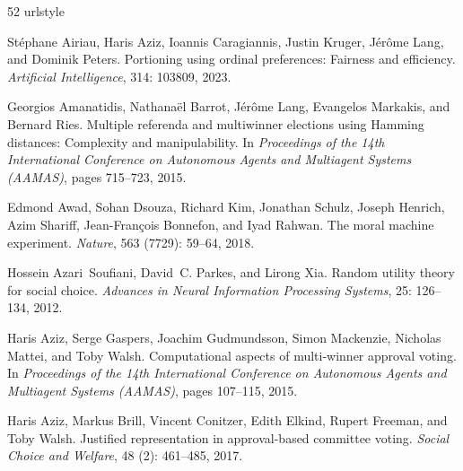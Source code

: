 \documentclass[10pt]{scrartcl}
\theoremstyle{plain}
\theoremstyle{definition}
\begin{document}

\begin{thebibliography}{52}
	\providecommand{\natexlab}[1]{#1}
	\providecommand{\url}[1]{\texttt{#1}}
	\expandafter\ifx\csname urlstyle\endcsname\relax
	\providecommand{\doi}[1]{doi: #1}\else
	\providecommand{\doi}{doi: \begingroup \urlstyle{rm}\Url}\fi
	
	St{\'e}phane Airiau, Haris Aziz, Ioannis Caragiannis, Justin Kruger,
	J{\'e}r{\^o}me Lang, and Dominik Peters.
	\newblock Portioning using ordinal preferences: Fairness and efficiency.
	\newblock \emph{Artificial Intelligence}, 314: 103809, 2023.
	
	Georgios Amanatidis, Nathana{\"e}l Barrot, J{\'e}r{\^o}me Lang, Evangelos
	Markakis, and Bernard Ries.
	\newblock Multiple referenda and multiwinner elections using {Hamming}
	distances: Complexity and manipulability.
	\newblock In \emph{Proceedings of the 14th International Conference on
		Autonomous Agents and Multiagent Systems (AAMAS)}, pages 715--723, 2015.
	
	Edmond Awad, Sohan Dsouza, Richard Kim, Jonathan Schulz, Joseph Henrich, Azim
	Shariff, Jean-Fran{\c{c}}ois Bonnefon, and Iyad Rahwan.
	\newblock The moral machine experiment.
	\newblock \emph{Nature}, 563 (7729): 59--64, 2018.
	
	Hossein Azari~Soufiani, David~C. Parkes, and Lirong Xia.
	\newblock Random utility theory for social choice.
	\newblock \emph{Advances in Neural Information Processing Systems},
	25: 126--134, 2012.
	
	Haris Aziz, Serge Gaspers, Joachim Gudmundsson, Simon Mackenzie, Nicholas
	Mattei, and Toby Walsh.
	\newblock Computational aspects of multi-winner approval voting.
	\newblock In \emph{Proceedings of the 14th International Conference on
		Autonomous Agents and Multiagent Systems (AAMAS)}, pages 107--115, 2015.
	
	Haris Aziz, Markus Brill, Vincent Conitzer, Edith Elkind, Rupert Freeman, and
	Toby Walsh.
	\newblock Justified representation in approval-based committee voting.
	\newblock \emph{Social Choice and Welfare}, 48 (2): 461--485,
	2017.
	

\end{thebibliography}
\end{document}
